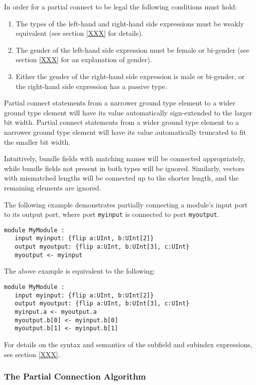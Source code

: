 \documentclass[12pt]{article}
\begin{document}
In order for a partial connect to be legal the following conditions must hold:
\begin{enumerate}
\item The types of the left-hand and right-hand side expressions must be weakly equivalent (see section \ref{XXX} for details).
\item The gender of the left-hand side expression must be female or bi-gender (see section \ref{XXX} for an explanation of gender).
\item Either the gender of the right-hand side expression is male or bi-gender, or the right-hand side expression has a passive type.
\end{enumerate}

Partial connect statements from a narrower ground type element to a wider ground type element will have its value automatically sign-extended to the larger bit width. Partial connect statements from a wider ground type element to a narrower ground type element will have its value automatically truncated to fit the smaller bit width. 

Intuitively, bundle fields with matching names will be connected appropriately, while bundle fields not present in both types will be ignored. Similarly, vectors with mismatched lengths will be connected up to the shorter length, and the remaining elements are ignored.

The following example demonstrates partially connecting a module's input port to its output port, where port \verb|myinput| is connected to port \verb|myoutput|.
\begin{verbatim}
module MyModule :
   input myinput: {flip a:UInt, b:UInt[2]}
   output myoutput: {flip a:UInt, b:UInt[3], c:UInt}
   myoutput <- myinput
\end{verbatim}

The above example is equivalent to the following:
\begin{verbatim}
module MyModule :
   input myinput: {flip a:UInt, b:UInt[2]}
   output myoutput: {flip a:UInt, b:UInt[3], c:UInt}
   myinput.a <- myoutput.a
   myoutput.b[0] <- myinput.b[0]
   myoutput.b[1] <- myinput.b[1]
\end{verbatim}
For details on the syntax and semantics of the subfield and subindex expressions, see section \ref{XXX}.

\subsubsection{The Partial Connection Algorithm}
\end{document}
